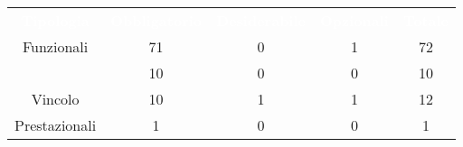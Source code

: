 \renewcommand{\arraystretch}{1.5}
\begin{longtable}{|c c c c c|} 
	
	\rowcolor{darkblue}
	\textcolor{white}{\textbf{Tipologia}}&
	\textcolor{white}{\textbf{Obbligatorio}}&
	\textcolor{white}{\textbf{Desiderabile}}&
	\textcolor{white}{\textbf{Opzionali}}&
	\textcolor{white}{\textbf{Totale}}\\
	
	Funzionali & 71 & 0 & 1 & 72 \\
	\glo{Qualità} & 10 & 0 & 0 & 10 \\
	Vincolo & 10 & 1 & 1 & 12 \\
	Prestazionali & 1 & 0 & 0 & 1 \\
	
\end{longtable}
